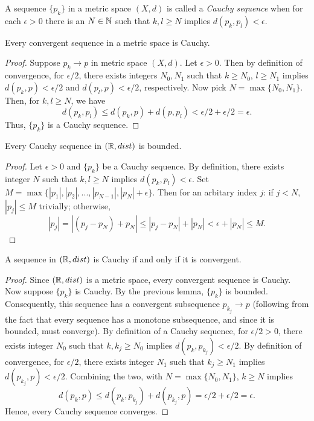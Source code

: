 \documentclass[letterpaper, twoside, 12pt]{book}
\begin{document}
\begin{definition}
  A sequence \(\{p_k\}\) in a metric space \((X,d)\) is called a
  \textit{Cauchy sequence} when for each \(\epsilon>0\) there is an
  \(N\in\mathbb N\) such that \(k,l\geq N\) implies \(d(p_k,p_l)<\epsilon\).
\end{definition}

\begin{proposition}[12.15]
  Every convergent sequence in a metric space is Cauchy.
\end{proposition}

\begin{proof}
    Suppose \(p_k \to p\) in metric space \((X, d)\). Let \(\epsilon > 0\).
    Then by definition of convergence, for \(\epsilon / 2\), there
    exists integers \(N_0, N_1\) such that \(k \geq N_0\), \(l \geq N_1\)
    implies \( d(p_k, p ) < \epsilon/2\) and \(d(p_l, p) < \epsilon / 2\),
    respectively. Now pick \(N = \max\{N_0, N_1\}\). Then, for \(k, l \geq N\),
    we have
    \[ d(p_k, p_l) \leq d(p_k, p) + d(p, p_l) < \epsilon/2 + \epsilon/2 = \epsilon .\]
    Thus, \(\{p_k\}\) is a Cauchy sequence.
\end{proof}

\begin{lemma}[9.3]
  Every Cauchy sequence in \((\mathbb R,dist)\) is bounded.
\end{lemma}

\begin{proof}
    Let \(\epsilon > 0\) and \(\{p_k\}\) be a Cauchy sequence.
    By definition, there exists integer \(N\) such that \(k, l \geq N\) implies 
    \(d(p_k, p_l) < \epsilon\). Set 
    \(M = \max\{ |p_1|, |p_2|, ..., |p_{N-1}|, |p_N| + \epsilon \} \).
    Then for an arbitary index \(j\): if \(j < N\), \(|p_j| \leq M\) trivially;
    otherwise,
    \[ |p_j| = |(p_j - p_N) + p_N| \leq |p_j - p_N| + |p_N| < \epsilon + |p_N| \leq M .\]
\end{proof}

\begin{theorem}[9.4]
  A sequence in \((\mathbb R,dist)\) is Cauchy if and only if it is convergent.
\end{theorem}

\begin{proof}
    Since \((\mathbb R, dist)\) is a metric space, every convergent sequence is Cauchy.
    Now suppose \(\{p_k\}\) is Cauchy. By the previous lemma, \(\{p_k\}\) is bounded.
    Consequently, this sequence has a convergent subsequence \(p_{k_j} \to p\) (following
    from the fact that every sequence has a monotone subsequence, and since it is bounded,
    must converge). By definition of a Cauchy sequence, for \(\epsilon/2 > 0\), there
    exists integer \(N_0\) such that \(k, k_j \geq N_0\) implies \(d(p_k, p_{k_j}) < \epsilon/2\).
    By definition of convergence, for \(\epsilon/2\), there exists integer \(N_1\)
    such that \(k_j \geq N_1\) implies \(d(p_{k_j}, p) < \epsilon/2\). Combining
    the two, with \(N = \max\{N_0, N_1\}\), \(k \geq N\) implies
    \[ d(p_k, p) \leq d(p_k, p_{k_j}) + d(p_{k_j}, p) = \epsilon/2 + \epsilon/2 = \epsilon .\]
    Hence, every Cauchy sequence converges.
\end{proof}
\end{document}
